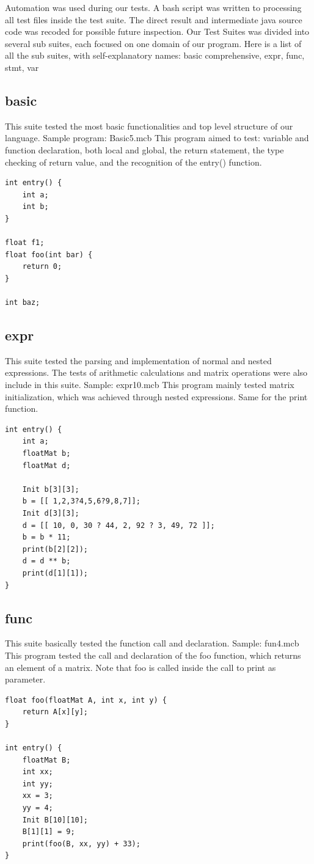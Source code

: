 \documentclass[12pt]{article} %
\begin{document}
Automation was used during our tests. A bash script was written to processing all test files inside the test suite. The direct result and intermediate java source code was recoded for possible future inspection. 
Our Test Suites was divided into several sub suites, each focused on one domain of our program. Here is a list of all the sub suites, with self-explanatory names: basic comprehensive, expr, func, stmt, var

\subsection{basic}
This suite tested the most basic functionalities and top level structure of our language. 
Sample program: Basic5.mcb 
This program aimed to test: variable and function declaration, both local and global, the return statement, the type checking of return value, and the recognition of the entry() function.  

\begin{lstlisting}
int entry() {
    int a;
    int b;
}

float f1;
float foo(int bar) {
    return 0;
}

int baz;

\end{lstlisting}

\subsection{expr}
This suite tested the parsing and implementation of normal and nested expressions. The tests of arithmetic calculations and matrix operations were also include in this suite.
Sample: expr10.mcb  
This program mainly tested matrix initialization, which was achieved through nested expressions. Same for the print function. 
\begin{lstlisting}
int entry() {
    int a;
    floatMat b;
    floatMat d;
    
    Init b[3][3];
    b = [[ 1,2,3?4,5,6?9,8,7]];
    Init d[3][3];
    d = [[ 10, 0, 30 ? 44, 2, 92 ? 3, 49, 72 ]];
    b = b * 11;
    print(b[2][2]);
    d = d ** b;
    print(d[1][1]);
}
\end{lstlisting}

\subsection{func}
This suite basically tested the function call and declaration. 
Sample: fun4.mcb
This program tested the call and declaration of the foo function, which returns an element of a matrix. Note that foo is called inside the call to print as parameter. 
\begin{lstlisting}
float foo(floatMat A, int x, int y) {
    return A[x][y];
}

int entry() {
    floatMat B;
    int xx;
    int yy;
    xx = 3;
    yy = 4;
    Init B[10][10];
    B[1][1] = 9;
    print(foo(B, xx, yy) + 33);
}

\end{lstlisting}
\end{document}
